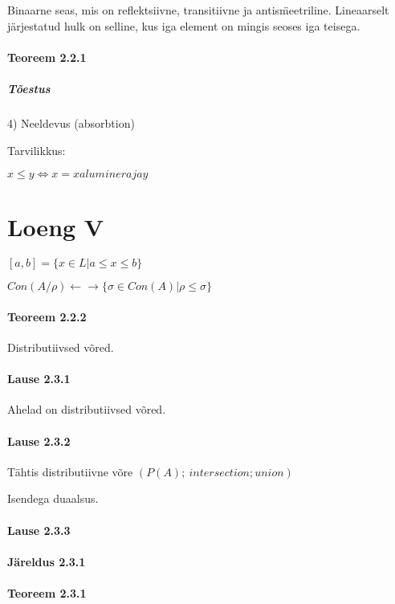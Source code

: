 \documentclass[12pt]{report}
\numberwithin{equation}{section}
\theoremstyle{definition}
\theoremstyle{plain}
\begin{document}
Binaarne seas, mis on reflektsiivne, transitiivne ja antis\"meetriline. Lineaarselt järjestatud hulk on selline, kus iga element on mingis seoses iga teisega.

\paragraph{Teoreem 2.2.1}

\subparagraph{Tõestus}

4) Neeldevus (absorbtion)

Tarvilikkus:

$x \leq y \iff x = x alumineraja y$

\section{Loeng V}

$[a,b] = \{x \in L | a \leq x \leq b \}$

$Con(A/\rho) \leftarrow \rightarrow \{\sigma \in Con(A) | \rho \leq \sigma \}$

\paragraph{Teoreem 2.2.2}

Distributiivsed võred. 

\paragraph{Lause 2.3.1}

Ahelad on distributiivsed võred.

\paragraph{Lause 2.3.2}

Tähtis distributiivne võre $(P(A); \
intersection; union)$

Isendega duaalsus.

\paragraph{Lause 2.3.3}

\paragraph{Järeldus 2.3.1}

\paragraph{Teoreem 2.3.1}
\end{document}
